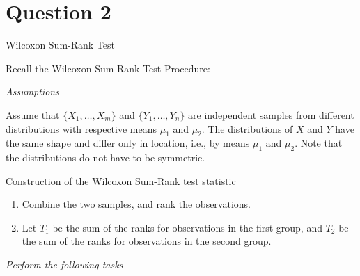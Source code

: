 \documentclass[letterpaper]{article}
\begin{document}
	\clearpage
	
	\section{Question 2}
	{\color{deepred} Wilcoxon Sum-Rank Test}
	
	\medskip
	
	Recall the Wilcoxon Sum-Rank Test Procedure:
	
	\medskip
	
	\emph{Assumptions}
	
	\medskip
	
	Assume that $\{X_1,\dots,X_m\}$ and $\{Y_1,\dots,Y_n\}$ are independent samples from different distributions with respective means $\mu_1$ and $\mu_2$. The distributions of $X$ and $Y$ have the same shape and differ only in location, i.e., by means $\mu_1$ and $\mu_2$. Note that the distributions do not have to be symmetric.
	
	\medskip
	
	\underline{Construction of the Wilcoxon Sum-Rank test statistic}
	
	\begin{enumerate}
		\item[a] Combine the two samples, and rank the observations.
		
		\item[b] Let $T_1$ be the sum of the ranks for observations in the first group, and $T_2$ be the sum of the ranks for observations in the second group.
	\end{enumerate}
	
	\medskip
	
	\emph{Perform the following tasks}
	
\end{document}

